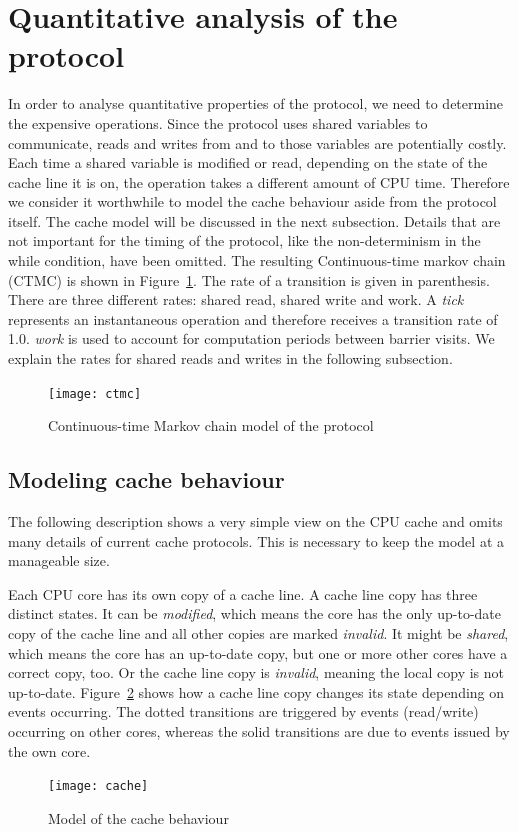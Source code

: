 \documentclass[a4paper, 10pt]{article}
\begin{document}
\section{Quantitative analysis of the protocol}
In order to analyse quantitative properties of the protocol, we need to determine the expensive operations. Since the protocol uses shared variables to communicate, reads and writes from and to those variables are potentially costly. Each time a shared variable is modified or read, depending on the state of the cache line it is on, the operation takes a different amount of CPU time. Therefore we consider it worthwhile to model the cache behaviour aside from the protocol itself. The cache model will be discussed in the next subsection. Details that are not important for the timing of the protocol, like the non-determinism in the while condition, have been omitted. The resulting Continuous-time markov chain (CTMC) is shown in Figure~\ref{fig:ctmc}. The rate of a transition is given in parenthesis. There are three different rates: shared read, shared write and work. A \emph{tick} represents an instantaneous operation and therefore receives a transition rate of 1.0. \emph{work} is used to account for computation periods between barrier visits. We explain the rates for shared reads and writes in the following subsection.
\begin{figure}[htbp]
	\centering
	\texttt{[image: ctmc]}
	\caption{Continuous-time Markov chain model of the protocol}
	\label{fig:ctmc}
\end{figure}
\subsection{Modeling cache behaviour}
The following description shows a very simple view on the CPU cache and omits many details of current cache protocols. This is necessary to keep the model at a manageable size.

Each CPU core has its own copy of a cache line. A cache line copy has three distinct states. It can be \emph{modified}, which means the core has the only up-to-date copy of the cache line and all other copies are marked \emph{invalid}. It might be \emph{shared}, which means the core has an up-to-date copy, but one or more other cores have a correct copy, too. Or the cache line copy is \emph{invalid}, meaning the local copy is not up-to-date. Figure~\ref{fig:cache} shows how a cache line copy changes its state depending on events occurring. The dotted transitions are triggered by events (read/write) occurring on other cores, whereas the solid transitions are due to events issued by the own core.
\begin{figure}[htbp]
	\centering
	\texttt{[image: cache]}
	\caption{Model of the cache behaviour}
	\label{fig:cache}
\end{figure}
\end{document}
